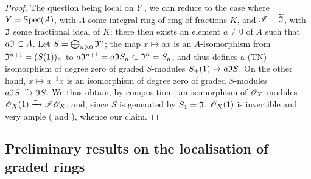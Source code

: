 \begin{proof}
\label{proof-2.8.1.11}
The question being local on $Y$ , we can reduce to the case where $Y=\operatorname{Spec}(A)$, with $A$ some integral ring of ring of fractions $K$, and $\mathscr{I}=\widetilde{\mathfrak{I}}$, with $\mathfrak{I}$ some fractional ideal of $K$;
there then exists an element $a\neq0$ of $A$ such that $a\mathfrak{I}\subset A$.
Let $S = \bigoplus_{n\geqslant0}\mathfrak{I}^n$;
the map $x\mapsto ax$ is an $A$-isomorphism from $\mathfrak{I}^{n+1} = (S(1))_n$ to $a\mathfrak{I}^{n+1} = a\mathfrak{I}S_n \subset \mathfrak{I}^n = S_n$,
and thus defines a (TN)-isomorphism of degree zero of graded $S$-modules $S_+(1)\to a\fk{I}S$.
On the other hand, $x\mapsto a^{-1}x$ is an isomorphism of degree zero of graded $S$-modules $a\mathfrak{I}S \xrightarrow{\sim} \mathfrak{I}S$.
We thus obtain, by composition , an isomorphism of $\mathscr{O}_X$-modules $\mathscr{O}_X(1) \xrightarrow{\sim} \mathscr{I}\mathscr{O}_X$, and, since $S$ is generated by $S_1=\mathfrak{I}$, $\mathscr{O}_X(1)$ is invertible  and very ample ( and ), whence our claim.
\end{proof}


\subsection{Preliminary results on the localisation of graded rings}
\label{subsection:2.8.2}

